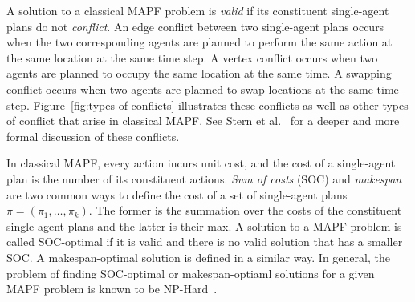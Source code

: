 \documentclass[review]{elsarticle}
\newcommand\konstantin[1]{\nb{\textbf{Konstantin:}}{red}{#1}}
\newcommand\roni[1]{\nb{\textbf{Roni:}}{green}{#1}}
\newcommand\dor[1]{\nb{\textbf{Dor:}}{Fuchsia}{#1}}
\newcommand{\mapf}{\ac{MAPF}\xspace}
\begin{document}
A solution to a classical MAPF problem is \emph{valid} if its constituent single-agent plans do not \emph{conflict}. 
An edge conflict between two single-agent plans occurs when the two corresponding agents are planned to perform the same action at the same location at the same time step. 
A vertex conflict occurs when two agents are planned to occupy the same location at the same time. 
A swapping conflict occurs when two agents are planned to swap locations at the same time step. 
Figure~\ref{fig:types-of-conflicts} illustrates these conflicts as well as other types of conflict that arise in classical MAPF. See Stern et al.~\cite{stern2019mapf} for a deeper and more formal discussion of these conflicts. 


In classical MAPF, every action incurs unit cost, 
and the cost of a single-agent plan is the number of its constituent actions. 
\emph{Sum of costs} (SOC) and \emph{makespan} are two common ways to define the cost of a set of single-agent plans $\pi=(\pi_1,\ldots, \pi_k)$. The former is the summation over the costs of the constituent single-agent plans and the latter is their max. A solution to a \mapf problem is called SOC-optimal if it is valid and there is no valid solution that has a smaller SOC. A makespan-optimal solution is defined in a similar way. 
In general, the problem of finding SOC-optimal or makespan-optiaml solutions for a given \mapf problem is known to be NP-Hard~\cite{yu2013multi,surynek2010optimization}.


\end{document}
